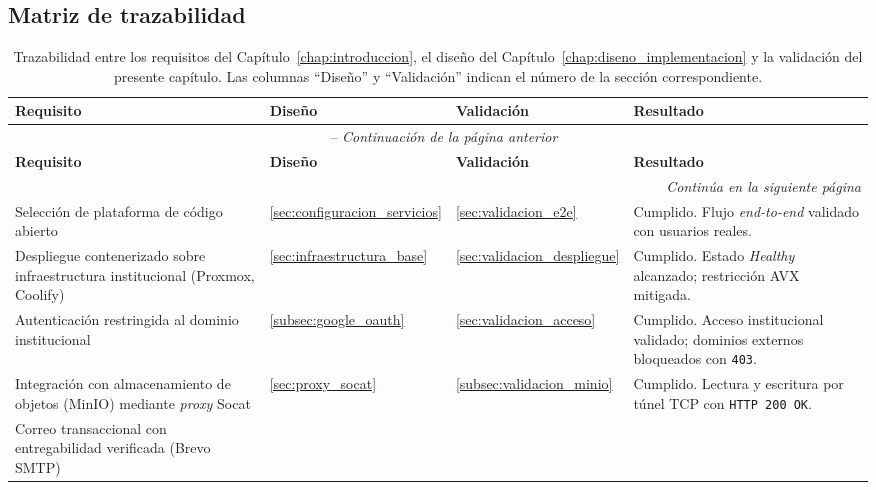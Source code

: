 \subsection{Matriz de trazabilidad}
\label{subsec:trazabilidad_requisitos}

\small
\begin{longtable}{p{3.8cm} p{1.6cm} p{1.6cm} p{5.2cm}}
    \caption[Matriz de trazabilidad de requisitos]{Trazabilidad entre los requisitos
    del Capítulo~\ref{chap:introduccion}, el diseño del
    Capítulo~\ref{chap:diseno_implementacion} y la validación del presente capítulo.
    Las columnas ``Diseño'' y ``Validación'' indican el número de la sección
    correspondiente.}
    \label{tab:trazabilidad} \\
    \toprule
    \textbf{Requisito} &
    \textbf{Diseño} &
    \textbf{Validación} &
    \textbf{Resultado} \\
    \midrule
    \endfirsthead
    \multicolumn{4}{c}{\tablename\ \thetable{} -- \textit{Continuación de la página anterior}} \\
    \toprule
    \textbf{Requisito} &
    \textbf{Diseño} &
    \textbf{Validación} &
    \textbf{Resultado} \\
    \midrule
    \endhead
    \midrule
    \multicolumn{4}{r}{\textit{Continúa en la siguiente página}} \\
    \endfoot
    \bottomrule
    \endlastfoot
    Selección de plataforma de código abierto &
    \ref{sec:configuracion_servicios} &
    \ref{sec:validacion_e2e} &
    Cumplido. Flujo \textit{end-to-end} validado con usuarios reales. \\
    \addlinespace
    Despliegue contenerizado sobre infraestructura institucional (Proxmox, Coolify) &
    \ref{sec:infraestructura_base} &
    \ref{sec:validacion_despliegue} &
    Cumplido. Estado \textit{Healthy} alcanzado; restricción AVX mitigada. \\
    \addlinespace
    Autenticación restringida al dominio institucional &
    \ref{subsec:google_oauth} &
    \ref{sec:validacion_acceso} &
    Cumplido. Acceso institucional validado; dominios externos bloqueados con
    \texttt{403}. \\
    \addlinespace
    Integración con almacenamiento de objetos (MinIO) mediante \textit{proxy} Socat &
    \ref{sec:proxy_socat} &
    \ref{subsec:validacion_minio} &
    Cumplido. Lectura y escritura por túnel TCP con \texttt{HTTP 200 OK}. \\
    \addlinespace
    Correo transaccional con entregabilidad verificada (Brevo SMTP) &

\end{longtable}
